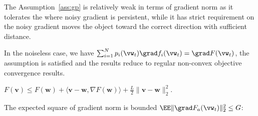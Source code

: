 \begin{remark}
	The Assumption~\ref{ass:gp} is relatively weak in terms of gradient norm as it tolerates the
	where noisy gradient is persistent, while it has strict requirement on the noisy gradient moves
	the object toward the correct direction with sufficient distance.
\end{remark}
In the noiseless case, we have $ \sum_{i=1}^N p_i(\vw_t)\grad f_i(\vw_t) = \grad F(\vw_t)$, the 
assumption is satisfied and the results reduce to regular non-convex objective convergence 
results. 

\begin{assumption}[L-smooth]
	$F(\mathbf{v}) \leq F(\mathbf{w})+\langle \mathbf{v}-\mathbf{w}, \nabla F(\mathbf{w}) \rangle +\frac{L}{2}\|\mathbf{v}-\mathbf{w}\|_{2}^{2}$.
	\label{ass:lsmooth}
\end{assumption}

\begin{assumption}
	The expected square of gradient norm is bounded $\EE \|\grad F_a(\vw_t)\|_2^2  \leq G$: 
	\label{ass:bgn}
\end{assumption}






